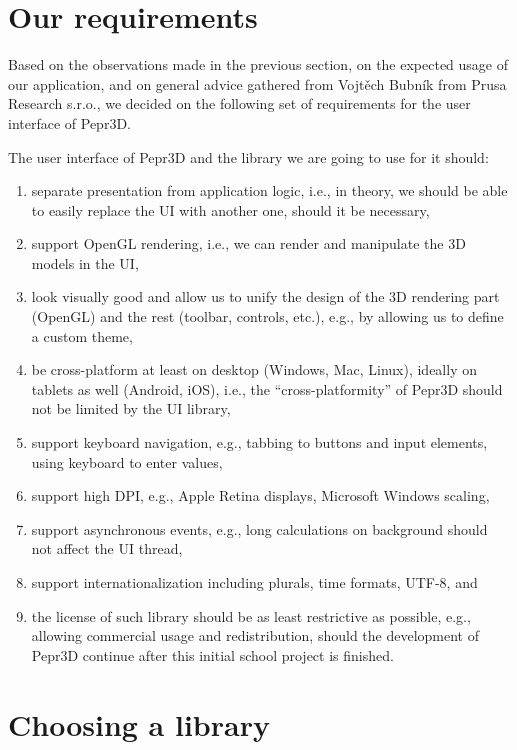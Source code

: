 \section{Our requirements}\label{sec:uireqs}

Based on the observations made in the previous section, on the expected usage of our application, and on general advice gathered from Vojtěch Bubník from Prusa Research s.r.o., we decided on the following set of requirements for the user interface of Pepr3D.

The user interface of Pepr3D and the library we are going to use for it should:
%
\begin{enumerate}
\setlength\itemsep{0em}
\item separate presentation from application logic, i.e., in theory, we should be able to easily replace the UI with another one, should it be necessary,
\item support OpenGL rendering, i.e., we can render and manipulate the 3D models in the UI,
\item look visually good and allow us to unify the design of the 3D rendering part (OpenGL) and the rest (toolbar, controls, etc.), e.g., by allowing us to define a custom theme,
\item be cross-platform at least on desktop (Windows, Mac, Linux), ideally on tablets as well (Android, iOS), i.e., the ``cross-platformity'' of Pepr3D should not be limited by the UI library,
\item support keyboard navigation, e.g., tabbing to buttons and input elements, using keyboard to enter values,
\item support high DPI, e.g., Apple Retina displays, Microsoft Windows scaling,
\item support asynchronous events, e.g., long calculations on background should not affect the UI thread,
\item support internationalization including plurals, time formats, UTF-8, and
\item the license of such library should be as least restrictive as possible, e.g., allowing commercial usage and redistribution, should the development of Pepr3D continue after this initial school project is finished.
\end{enumerate}

\section{Choosing a library}

